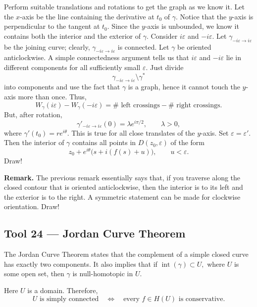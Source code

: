 \documentclass[11pt,a4paper]{article}
\begin{document}
Perform suitable translations and rotations to get the graph as we know it. Let the \(x\)-axis be the line containing the derivative at \(t_0\) of \(\gamma\). Notice that the \(y\)-axis is perpendicular to the tangent at \(t_0\). Since the \(y\)-axis is unbounded, we know it contains both the interior and the exterior of \(\gamma\). Consider \(i\varepsilon\) and \(-i\varepsilon\). Let \(\gamma_{-i\varepsilon\to i\varepsilon}\) be the joining curve; clearly, \(\gamma_{-i\varepsilon\to i\varepsilon}\) is connected. Let \(\gamma\) be oriented anticlockwise. A simple connectedness argument tells us that \(i\varepsilon\) and \(-i\varepsilon\) lie in different components for all sufficiently small \(\varepsilon\). Just divide
\[
  \gamma_{-i\varepsilon\to i\varepsilon}\setminus\gamma^*
\]
into components and use the fact that \(\gamma\) is a graph, hence it cannot touch the \(y\)-axis more than once. Thus,
\[
  W_\gamma(i\varepsilon)-W_\gamma(-i\varepsilon)
  =\#\text{ left crossings}-\#\text{ right crossings}.
\]
But, after rotation,
\[
  \gamma'_{-i\varepsilon\to i\varepsilon}(0)
  =\lambda e^{i\pi/2},
  \qquad \lambda>0,
\]
where \(\gamma'(t_0)=re^{i\theta}\). This is true for all close translates of the \(y\)-axis. Set \(\varepsilon=\varepsilon'\). Then the interior of \(\gamma\) contains all points in \(D(z_0,\varepsilon)\) of the form
\[
  z_0+e^{i\theta}\bigl(s+i(f(s)+u)\bigr),
  \qquad u<\varepsilon.
\]
Draw!

\textbf{Remark.}
The previous remark essentially says that, if you traverse along the closed contour that is oriented anticlockwise, then the interior is to its left and the exterior is to the right. A symmetric statement can be made for clockwise orientation. Draw!

\subsection*{Tool 24 — Jordan Curve Theorem}
\label{tool:jordan-curve}
The Jordan Curve Theorem states that the complement of a simple closed curve has exactly two components. It also implies that if \(\operatorname{int}(\gamma)\subset U,\)
where \(U\) is some open set, then \(\gamma\) is null-homotopic in \(U\).

Here \(U\) is a domain. Therefore,
\[
  U\text{ is simply connected}
  \quad\Longleftrightarrow\quad
  \text{every }f\in H(U)\text{ is conservative}.
\]
\end{document}
